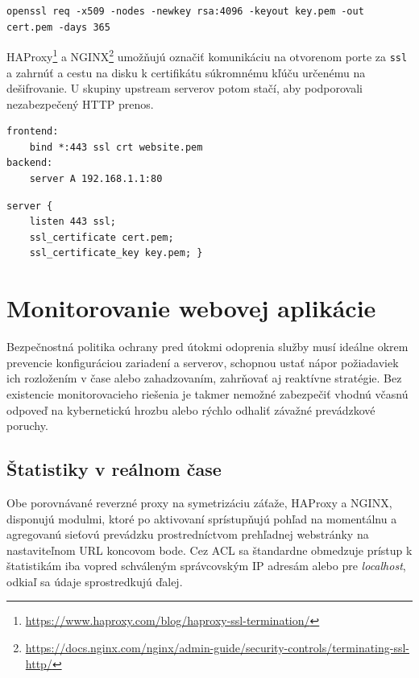 \documentclass[12pt, a4paper]{article}
\begin{document}
\noindent\begin{lstlisting}[caption=OpenSSL požiadavka (CSR) na samo popísanie certifikátu X.509 so súkromným kľúčom RSA o dĺžke 4096 bitov a ročnou platnosťou, basicstyle=\ttfamily\scriptsize]
openssl req -x509 -nodes -newkey rsa:4096 -keyout key.pem -out cert.pem -days 365
\end{lstlisting}

HAProxy\footnote{\url{https://www.haproxy.com/blog/haproxy-ssl-termination/}} 
a NGINX\footnote{\url{https://docs.nginx.com/nginx/admin-guide/security-controls/terminating-ssl-http/}}
umožňujú označiť komunikáciu na otvorenom porte za \verb|ssl| a zahrnúť a cestu na disku k certifikátu 
súkromnému kľúču určenému na dešifrovanie. U skupiny upstream serverov potom stačí, aby podporovali 
nezabezpečený HTTP prenos.  
 
\noindent\begin{minipage}{.48\textwidth}
\begin{lstlisting}[caption=HAProxy: TLS termination]
frontend:
    bind *:443 ssl crt website.pem 
backend:
    server A 192.168.1.1:80
\end{lstlisting}
\end{minipage}\hfill
\begin{minipage}{.48\textwidth}
\begin{lstlisting}[caption=NGINX: TLS termination]
server {
    listen 443 ssl;
    ssl_certificate cert.pem;
    ssl_certificate_key key.pem; }
\end{lstlisting}
\end{minipage}

\section{Monitorovanie webovej aplikácie}
Bezpečnostná politika ochrany pred útokmi odoprenia služby musí ideálne okrem prevencie
konfiguráciou zariadení a serverov, schopnou ustať nápor požiadaviek ich rozložením v čase alebo
zahadzovaním, zahrňovať aj reaktívne stratégie. Bez existencie monitorovacieho riešenia je
takmer nemožné zabezpečiť vhodnú včasnú odpoveď na kybernetickú hrozbu alebo rýchlo odhaliť 
závažné prevádzkové poruchy.

\subsection{Štatistiky v reálnom čase}
Obe porovnávané reverzné proxy na symetrizáciu záťaže, HAProxy a NGINX, disponujú modulmi, ktoré po 
aktivovaní sprístupňujú pohľad na momentálnu a agregovanú sieťovú prevádzku prostredníctvom
prehľadnej webstránky na nastaviteľnom URL koncovom bode. Cez ACL sa štandardne obmedzuje prístup
k štatistikám iba vopred schváleným správcovským IP adresám alebo pre \emph{localhost}, odkiaľ
sa údaje sprostredkujú ďalej.
\end{document}
